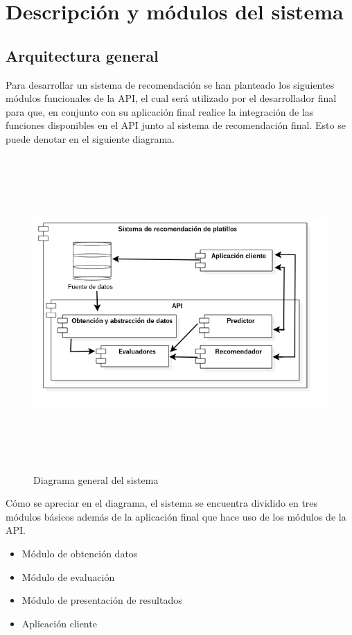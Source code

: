 \section {Descripción y módulos del sistema}

  \subsection{Arquitectura general}
    Para desarrollar un sistema de recomendación se han planteado los siguientes módulos funcionales de la API, el cual será utilizado por el desarrollador final para que, en conjunto con su aplicación final realice la integración de las funciones disponibles en el API junto al sistema de recomendación final. Esto se puede denotar en el siguiente diagrama.

\newpage
    \begin{landscape}
      \begin{figure}[h!]
      \centering
      \includegraphics[width=22.5cm,height=12cm]{./images/architecture.png}
      \caption{Diagrama general del sistema}
    \end{figure}
    \end{landscape}
  \newpage

Cómo se apreciar en el diagrama, el sistema se encuentra dividido en tres módulos básicos además de la aplicación final que hace uso de los módulos de la API.
    \begin{itemize}
    \item Módulo de obtención datos
    \item Módulo de evaluación
    \item Módulo de presentación de resultados
    \item Aplicación cliente
  \end{itemize}

